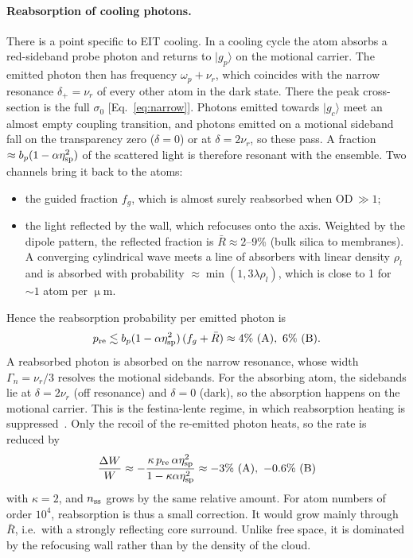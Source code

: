 \documentclass[11pt,a4paper]{article}
\newcommand{\micro}{\upmu}\newcommand{\metre}{m}\newcommand{\kelvin}{K}
\newcommand{\si}[1]{\ensuremath{\mathrm{#1}}}
\newcommand{\ket}[1]{|#1\rangle}
\newcommand{\gp}{\ket{g_p}}
\newcommand{\gc}{\ket{g_c}}
\begin{document}
\paragraph{Reabsorption of cooling photons.} There is a point specific to EIT cooling. In a cooling cycle the atom absorbs a red-sideband probe photon and returns to $\gp$ on the motional carrier. The emitted photon then has frequency $\omega_p+\nu_r$, which coincides with the narrow resonance $\delta_+=\nu_r$ of every other atom in the dark state. There the peak cross-section is the full $\sigma_0$ [Eq.~\eqref{eq:narrow}]. Photons emitted towards $\gc$ meet an almost empty coupling transition, and photons emitted on a motional sideband fall on the transparency zero ($\delta=0$) or at $\delta=2\nu_r$, so these pass. A fraction $\approx b_p(1-\alpha\eta_{\rm sp}^2)$ of the scattered light is therefore resonant with the ensemble. Two channels bring it back to the atoms:
\begin{itemize}
\item the guided fraction $f_g$, which is almost surely reabsorbed when OD\,$\gg1$;
\item the light reflected by the wall, which refocuses onto the axis. Weighted by the dipole pattern, the reflected fraction is $\bar R\approx2$--9\% (bulk silica to membranes). A converging cylindrical wave meets a line of absorbers with linear density $\rho_l$ and is absorbed with probability $\approx\min(1,3\lambda\rho_l)$, which is close to 1 for $\sim1$ atom per \si{\micro m}.
\end{itemize}
Hence the reabsorption probability per emitted photon is
\begin{equation}
  p_{\rm re}\lesssim b_p(1-\alpha\eta_{\rm sp}^2)\,(f_g+\bar R)\approx4\%\ \text{(A)},\ 6\%\ \text{(B)}.
\end{equation}
A reabsorbed photon is absorbed on the narrow resonance, whose width $\Gamma_n=\nu_r/3$ resolves the motional sidebands. For the absorbing atom, the sidebands lie at $\delta=2\nu_r$ (off resonance) and $\delta=0$ (dark), so the absorption happens on the motional carrier. This is the festina-lente regime, in which reabsorption heating is suppressed~\cite{castin1998}. Only the recoil of the re-emitted photon heats, so the rate is reduced by
\begin{equation}
  \frac{\Delta W}{W}\approx-\frac{\kappa\,p_{\rm re}\,\alpha\eta_{\rm sp}^2}{1-\kappa\alpha\eta_{\rm sp}^2}\approx-3\%\ \text{(A)},\ -0.6\%\ \text{(B)}
\end{equation}
with $\kappa=2$, and $n_{\rm ss}$ grows by the same relative amount. For atom numbers of order $10^4$, reabsorption is thus a small correction. It would grow mainly through $\bar R$, i.e.\ with a strongly reflecting core surround. Unlike free space, it is dominated by the refocusing wall rather than by the density of the cloud.
\end{document}
